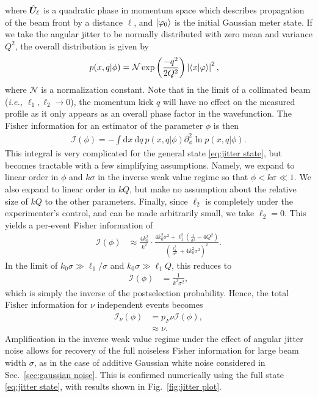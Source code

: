 where $\hat{\bm U}_\ell$ is a quadratic phase in momentum space which describes propagation of the beam front by a distance $\ell$, and $\lvert \varphi_0\rangle$ is the initial Gaussian meter state.  If we take the angular jitter to be normally distributed with zero mean and variance $Q^2$, the overall distribution is given by 
\begin{align}
	p(x,q|\phi) &= \mathcal{N}\exp\left(\frac{-q^2}{2Q^2}\right)\left|\langle x \vert \varphi \rangle\right|^2,
\end{align}   
where $\mathcal{N}$ is a normalization constant.  Note that in the limit of a collimated beam (\emph{i.e.,} $\ell_1,\ell_2 \rightarrow 0$), the momentum kick $q$ will have no effect on the measured profile as it only appears as an overall phase factor in the wavefunction.  The Fisher information for an estimator of the parameter $\phi$ is then
\begin{align}
	\mathcal{I}(\phi) = -\int \text{d}x~ \text{d}q~ p(x,q|\phi)\partial_\phi^2 \ln p(x,q|\phi).
\end{align}
This integral is very complicated for the general state \eqref{eq:jitter state}, but becomes tractable with a few simplifying assumptions.  Namely, we expand to linear order in $\phi$ and $k\sigma$ in the inverse weak value regime so that $\phi < k\sigma \ll 1$.  We also expand to linear order in $kQ$, but make no assumption about the relative size of $kQ$ to the other parameters.  Finally, since $\ell_2$ is completely under the experimenter's control, and can be made arbitrarily small, we take $\ell_2=0$.  This yields a per-event Fisher information of 
\begin{align}
	\mathcal{I}(\phi) &\approx \frac{4k_0^2}{k^2} \cdot \frac{4k_0^2\sigma^2 + \ell_1^2\left(\frac{1}{\sigma^2} -4Q^2\right)}{\left(\frac{\ell_1^2}{\sigma^2} + 4k_0^2\sigma^2\right)^2}.
\end{align}
In the limit of $k_0\sigma \gg \ell_1/\sigma$ and $k_0\sigma \gg \ell_1Q$, this reduces to 
\begin{align}
	\mathcal{I}(\phi) &= \frac{1}{k^2\sigma^2},
\end{align}
which is simply the inverse of the postselection probability.  Hence, the total Fisher information for $\nu$ independent events becomes 
\begin{align}
	\mathcal{I}_\nu(\phi) &= p_F\nu \mathcal{I}(\phi), \nonumber \\
	&\approx \nu.
\end{align}
Amplification in the inverse weak value regime under the effect of angular jitter noise allows for recovery of the full noiseless Fisher information for large beam width $\sigma$, as in the case of additive Gaussian white noise considered in Sec.~\ref{sec:gaussian noise}.  This is confirmed numerically using the full state \eqref{eq:jitter state}, with results shown in Fig.~\ref{fig:jitter plot}.

